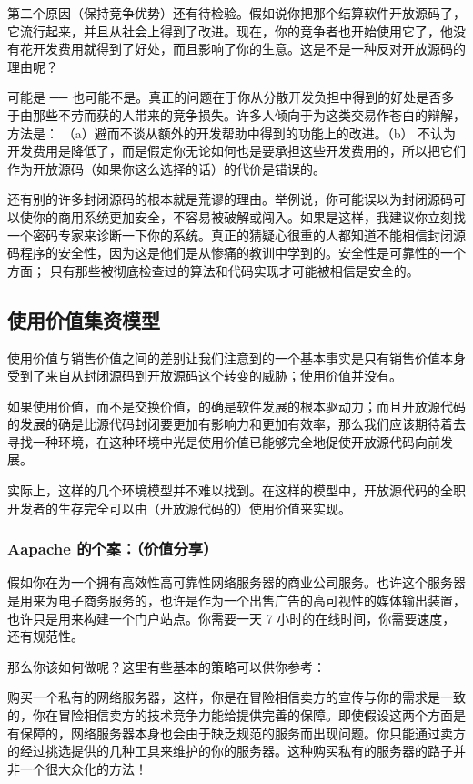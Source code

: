 第二个原因（保持竞争优势）还有待检验。假如说你把那个结算软件开放源码了，它流行起来，并且从社会上得到了改进。现在，你的竞争者也开始使用它了，他没有花开发费用就得到了好处，而且影响了你的生意。这是不是一种反对开放源码的理由呢？


可能是  ──  也可能不是。真正的问题在于你从分散开发负担中得到的好处是否多于由那些不劳而获的人带来的竞争损失。许多人倾向于为这类交易作苍白的辩解，方法是： （a）避而不谈从额外的开发帮助中得到的功能上的改进。（b） 不认为开发费用是降低了，而是假定你无论如何也是要承担这些开发费用的，所以把它们作为开放源码（如果你这么选择的话）的代价是错误的。


还有别的许多封闭源码的根本就是荒谬的理由。举例说，你可能误以为封闭源码可以使你的商用系统更加安全，不容易被破解或闯入。如果是这样，我建议你立刻找一个密码专家来诊断一下你的系统。真正的猜疑心很重的人都知道不能相信封闭源码程序的安全性，因为这是他们是从惨痛的教训中学到的。安全性是可靠性的一个方面； 只有那些被彻底检查过的算法和代码实现才可能被相信是安全的。


\subsection{使用价值集资模型}
使用价值与销售价值之间的差别让我们注意到的一个基本事实是只有销售价值本身受到了来自从封闭源码到开放源码这个转变的威胁；使用价值并没有。


如果使用价值，而不是交换价值，的确是软件发展的根本驱动力；而且开放源代码的发展的确是比源代码封闭要更加有影响力和更加有效率，那么我们应该期待着去寻找一种环境，在这种环境中光是使用价值已能够完全地促使开放源代码向前发展。


实际上，这样的几个环境模型并不难以找到。在这样的模型中，开放源代码的全职开发者的生存完全可以由（开放源代码的）使用价值来实现。

\subsubsection{Aapache 的个案：（价值分享）}
假如你在为一个拥有高效性高可靠性网络服务器的商业公司服务。也许这个服务器是用来为电子商务服务的，也许是作为一个出售广告的高可视性的媒体输出装置，也许只是用来构建一个门户站点。你需要一天 7 小时的在线时间，你需要速度，还有规范性。


那么你该如何做呢？这里有些基本的策略可以供你参考：


购买一个私有的网络服务器，这样，你是在冒险相信卖方的宣传与你的需求是一致的，你在冒险相信卖方的技术竞争力能给提供完善的保障。即使假设这两个方面是有保障的，网络服务器本身也会由于缺乏规范的服务而出现问题。你只能通过卖方的经过挑选提供的几种工具来维护的你的服务器。这种购买私有的服务器的路子并非一个很大众化的方法！


